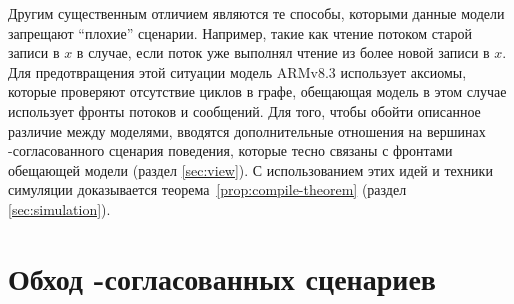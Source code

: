 Другим существенным отличием являются те способы, которыми данные модели запрещают ``плохие'' сценарии.  Например,
такие как чтение потоком старой записи в $x$ в случае, если поток уже выполнял чтение из более новой записи в $x$.
Для предотвращения этой ситуации модель ARMv8.3 использует аксиомы, которые проверяют отсутствие циклов в графе, 
обещающая модель в этом случае использует фронты потоков и сообщений.
Для того, чтобы обойти описанное различие между моделями,
вводятся дополнительные отношения на вершинах \ARM-согласованного сценария поведения,
которые тесно связаны с фронтами обещающей модели (раздел \ref{sec:view}).
С использованием этих идей и техники симуляции
доказывается теорема~\ref{prop:compile-theorem} %
(раздел \ref{sec:simulation}).
%

\section{Обход \ARM-согласованных сценариев}
\label{sec:traversal}


